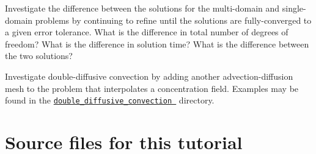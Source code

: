 \begin{DoxyEnumerate}
\item Investigate the difference between the solutions for the multi-\/domain and single-\/domain problems by continuing to refine until the solutions are fully-\/converged to a given error tolerance. What is the difference in total number of degrees of freedom? What is the difference in solution time? What is the difference between the two solutions? ~\newline
~\newline

\item Investigate double-\/diffusive convection by adding another advection-\/diffusion mesh to the problem that interpolates a concentration field. Examples may be found in the \href{../../../../demo_drivers/multi_physics/double_diffusive_convection}{\tt double\+\_\+diffusive\+\_\+convection } directory.
\end{DoxyEnumerate}

 

 \hypertarget{index_sources}{}\section{Source files for this tutorial}\label{index_sources}

